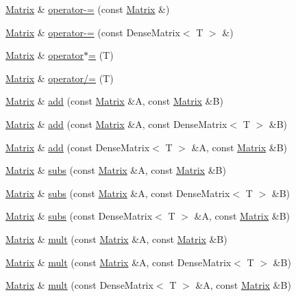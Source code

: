 \begin{DoxyCompactItemize}
\item 
\hyperlink{classMatrix}{Matrix} \& \hyperlink{classMatrix_a22f1dad5c5fb9f37459517743442bbbd}{operator-\/=} (const \hyperlink{classMatrix}{Matrix} \&)
\item 
\hyperlink{classMatrix}{Matrix} \& \hyperlink{classMatrix_af944ddec439b0242de0feca1d7955a16}{operator-\/=} (const Dense\-Matrix$<$ T $>$ \&)
\item 
\hyperlink{classMatrix}{Matrix} \& \hyperlink{classMatrix_ac610da076cedafce9a3f65475cb3e8b5}{operator$\ast$=} (T)
\item 
\hyperlink{classMatrix}{Matrix} \& \hyperlink{classMatrix_aa8abca2bdd8d1a858a44520cf75ebf8b}{operator/=} (T)
\item 
\hyperlink{classMatrix}{Matrix} \& \hyperlink{classMatrix_a87e9ba44e1adfb175800069fe8070a64}{add} (const \hyperlink{classMatrix}{Matrix} \&A, const \hyperlink{classMatrix}{Matrix} \&B)
\item 
\hyperlink{classMatrix}{Matrix} \& \hyperlink{classMatrix_a340d3452219c80b00eeac701b97b2964}{add} (const \hyperlink{classMatrix}{Matrix} \&A, const Dense\-Matrix$<$ T $>$ \&B)
\item 
\hyperlink{classMatrix}{Matrix} \& \hyperlink{classMatrix_a7a1afbab88d965b02eba69a2c8fec1d4}{add} (const Dense\-Matrix$<$ T $>$ \&A, const \hyperlink{classMatrix}{Matrix} \&B)
\item 
\hyperlink{classMatrix}{Matrix} \& \hyperlink{classMatrix_aaee38bfbbbda0e76f1cb51d4bff11d66}{subs} (const \hyperlink{classMatrix}{Matrix} \&A, const \hyperlink{classMatrix}{Matrix} \&B)
\item 
\hyperlink{classMatrix}{Matrix} \& \hyperlink{classMatrix_a6f730c77510da6ba5afca55f4d723001}{subs} (const \hyperlink{classMatrix}{Matrix} \&A, const Dense\-Matrix$<$ T $>$ \&B)
\item 
\hyperlink{classMatrix}{Matrix} \& \hyperlink{classMatrix_ad5d018ff9e180ea393ef967e832ac069}{subs} (const Dense\-Matrix$<$ T $>$ \&A, const \hyperlink{classMatrix}{Matrix} \&B)
\item 
\hyperlink{classMatrix}{Matrix} \& \hyperlink{classMatrix_a2c7c2f0c8b16e0cc2e1ac4c94dcee326}{mult} (const \hyperlink{classMatrix}{Matrix} \&A, const \hyperlink{classMatrix}{Matrix} \&B)
\item 
\hyperlink{classMatrix}{Matrix} \& \hyperlink{classMatrix_a4934d91ec76b1e730aaeba4e0cbcc15c}{mult} (const \hyperlink{classMatrix}{Matrix} \&A, const Dense\-Matrix$<$ T $>$ \&B)
\item 
\hyperlink{classMatrix}{Matrix} \& \hyperlink{classMatrix_a11729be8fe22239ae5674f2e2551f6a0}{mult} (const Dense\-Matrix$<$ T $>$ \&A, const \hyperlink{classMatrix}{Matrix} \&B)

\end{DoxyCompactItemize}
